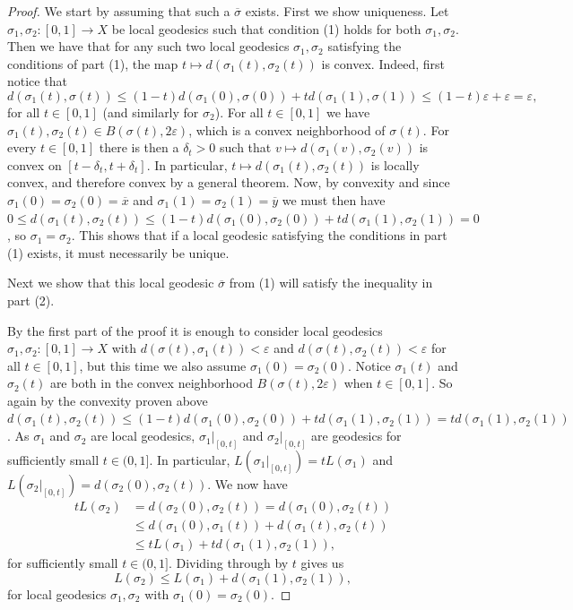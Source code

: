 \documentclass[10pt,a4paper]{amsart}
\begin{document}
\begin{proof}
We start by assuming that such a \(\overline{\sigma}\) exists.
First we show uniqueness.
Let \(\sigma_1,\sigma_2:[0,1]\to X\) be local geodesics such that condition (1) holds for both $\sigma_1,\sigma_2$. Then we have that for any such two local geodesics \(\sigma_1,\sigma_2\) satisfying the conditions of part (1), the map \(t\mapsto d(\sigma_1(t),\sigma_2(t))\) is convex. Indeed, first notice that 
$$d(\sigma_1(t),\sigma(t))\leq (1-t)d(\sigma_1(0),\sigma(0))+td(\sigma_1(1),\sigma(1))\leq (1-t)\varepsilon+\varepsilon=\varepsilon,$$ 
for all \(t\in [0,1]\) (and similarly for \(\sigma_2\)).
For all \(t\in [0,1]\) we have \(\sigma_1(t),\sigma_2(t)\in B(\sigma(t),2\varepsilon)\), which is a convex neighborhood of \(\sigma(t)\).
For every \(t\in [0,1]\) there is then a \(\delta_t>0\) such that \(v\mapsto d(\sigma_1(v),\sigma_2(v))\) is convex on \([t-\delta_t,t+\delta_t]\).
In particular, \(t\mapsto d(\sigma_1(t),\sigma_2(t))\) is locally convex, and therefore convex by a general theorem.
Now, by convexity and since \(\sigma_1(0)=\sigma_2(0)=\overline{x}\) and \(\sigma_1(1)=\sigma_2(1)=\overline{y}\) we must then have \(0\leq d(\sigma_1(t),\sigma_2(t))\leq (1-t)d(\sigma_1(0),\sigma_2(0))+td(\sigma_1(1),\sigma_2(1))=0\), so \(\sigma_1=\sigma_2\).
This shows that if a local geodesic satisfying the conditions in part (1) exists, it must necessarily be unique.

\medskip
Next we show that this local geodesic $\overline{\sigma}$ from (1) will satisfy the inequality in part (2).

 By the first part of the proof it is enough to consider local geodesics \(\sigma_1,\sigma_2:[0,1]\to X\) with \(d(\sigma(t),\sigma_1(t))<\varepsilon\) and \(d(\sigma(t),\sigma_2(t))<\varepsilon\) for all \(t\in [0,1]\), but this time we also assume \(\sigma_1(0)=\sigma_2(0)\). Notice 
\(\sigma_1(t)\) and \(\sigma_2(t)\) are both in the convex neighborhood \(B(\sigma(t),2\varepsilon)\) when \(t\in [0,1]\). So again by the convexity proven above \(d(\sigma_1(t),\sigma_2(t))\leq (1-t)d(\sigma_1(0),\sigma_2(0))+td(\sigma_1(1),\sigma_2(1))=td(\sigma_1(1),\sigma_2(1))\).
As \(\sigma_1\) and \(\sigma_2\) are local geodesics, \(\sigma_1|_{[0,t]}\) and \(\sigma_2|_{[0,t]}\) are geodesics for sufficiently small \(t\in (0,1]\).
In particular, \(L(\sigma_1|_{[0,t]})=tL(\sigma_1)\) and \(L(\sigma_2|_{[0,t]})=d(\sigma_2(0),\sigma_2(t))\).
We now have
\begin{align*}
tL(\sigma_2)&=d(\sigma_2(0),\sigma_2(t))=d(\sigma_1(0),\sigma_2(t))\\
            &\leq d(\sigma_1(0),\sigma_1(t))+d(\sigma_1(t),\sigma_2(t))\\
            &\leq tL(\sigma_1)+td(\sigma_1(1),\sigma_2(1)),
\end{align*}
for sufficiently small \(t\in (0,1]\).
Dividing through by \(t\) gives us
\begin{equation}\label{eq:length_ineq}L(\sigma_2)\leq L(\sigma_1)+d(\sigma_1(1),\sigma_2(1)),\end{equation}
for local geodesics \(\sigma_1,\sigma_2\) with \(\sigma_1(0)=\sigma_2(0)\).


\end{proof}
\end{document}
